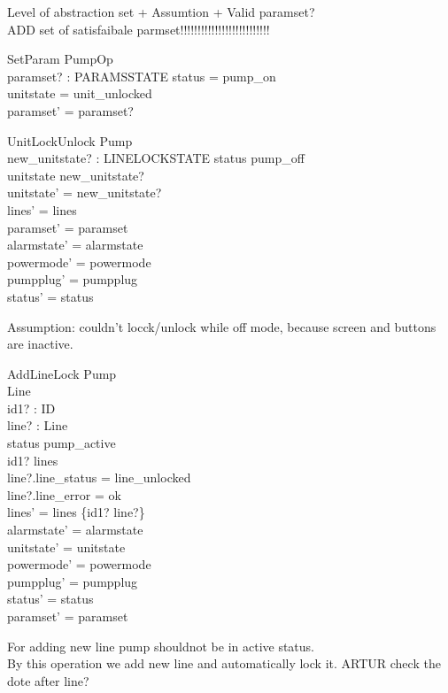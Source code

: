 \documentclass{article}
\begin{document}
	Level of abstraction set + Assumtion + Valid paramset?\\
	ADD set of satisfaibale parmset!!!!!!!!!!!!!!!!!!!!!!!!!!
	\begin{schema}{SetParam}
		PumpOp \\
		paramset? : PARAMSSTATE 
	\where
		status = pump\_on \\ 
		unitstate = unit\_unlocked \\
		paramset' = paramset?
	\end{schema}
	
    \begin{schema}{UnitLockUnlock}
		\Delta Pump \\
		new\_unitstate? : LINELOCKSTATE
	\where
		status \neq pump\_off \\ 
		unitstate \neq new\_unitstate? \\
		unitstate' = new\_unitstate? \\
    	lines' = lines  \\
    	paramset' = paramset\\
    	alarmstate' = alarmstate \\
    	powermode' = powermode \\
    	pumpplug' = pumpplug \\
    	status' = status \\	
	\end{schema}
	Assumption: couldn't locck/unlock while off mode, because screen and buttons are inactive.
	
	

    \begin{schema}{AddLineLock}
		\Delta Pump \\
		\Delta Line \\
		id1? : ID \\
		line? : Line \\
	\where
	    status \neq pump\_active \\
		id1? \notin \dom lines \\
		line?.line\_status = line\_unlocked \\
		line?.line\_error = ok\\
    	lines' = lines \cup \{id1? \mapsto line?\} \\
    	alarmstate' = alarmstate \\
    	unitstate' = unitstate \\
    	powermode' = powermode \\
    	pumpplug' = pumpplug \\
    	status' = status \\
    	paramset' = paramset
	\end{schema}
	For adding new line pump shouldnot be in active status.\\
    By this operation we add new line and automatically lock it. ARTUR check the dote after line?
	
\end{document}
